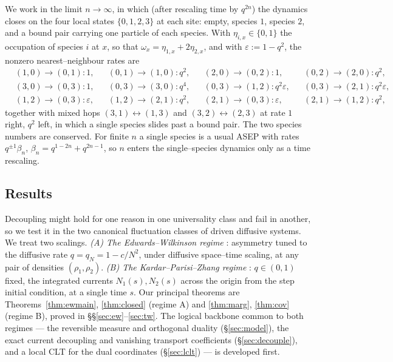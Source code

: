 \documentclass[11pt]{article}
\theoremstyle{plain}
\theoremstyle{definition}
\theoremstyle{remark}
\newcommand{\eps}{\varepsilon}\newcommand{\Exp}{\mathrm{Exp}}
\begin{document}
We work in the limit $n\to\infty$, in which (after rescaling time by $q^{2n}$) the
dynamics closes on the four local states $\{0,1,2,3\}$ at each site: empty, species
$1$, species $2$, and a bound pair carrying one particle of each species. With
$\eta_{i,x}\in\{0,1\}$ the occupation of species $i$ at $x$, so that
$\omega_x=\eta_{1,x}+2\eta_{2,x}$, and with $\eps:=1-q^2$, the nonzero
nearest--neighbour rates are
\begin{equation}\label{eq:rates}
\begin{aligned}
&(1,0)\!\to\!(0,1):1, &&(0,1)\!\to\!(1,0):q^2, &&(2,0)\!\to\!(0,2):1, &&(0,2)\!\to\!(2,0):q^2,\\
&(3,0)\!\to\!(0,3):1, &&(0,3)\!\to\!(3,0):q^4, &&(0,3)\!\to\!(1,2):q^2\eps, &&(0,3)\!\to\!(2,1):q^2\eps,\\
&(1,2)\!\to\!(0,3):\eps, &&(1,2)\!\to\!(2,1):q^2, &&(2,1)\!\to\!(0,3):\eps, &&(2,1)\!\to\!(1,2):q^2,
\end{aligned}
\end{equation}
together with mixed hops $(3,1)\!\leftrightarrow\!(1,3)$ and
$(3,2)\!\leftrightarrow\!(2,3)$ at rate $1$ right, $q^2$ left, in which a single
species slides past a bound pair. The two species numbers are conserved. For finite
$n$ a single species is a usual ASEP with rates $q^{\pm1}\beta_n$,
$\beta_n=q^{1-2n}+q^{2n-1}$, so $n$ enters the single--species dynamics only as a time
rescaling.

\subsection{Results}\label{sec:introresults}
Decoupling might hold for one reason in one universality class and fail in another, so
we test it in the two canonical fluctuation classes of driven diffusive systems. We
treat two scalings. \emph{(A) The Edwards--Wilkinson regime} \cite{EW}: asymmetry tuned to
the diffusive rate $q=q_N=1-c/N^2$, under diffusive space--time scaling, at any pair of
densities $(\rho_1,\rho_2)$. \emph{(B) The Kardar--Parisi--Zhang
regime} \cite{KPZ}: $q\in(0,1)$ fixed, the integrated currents $N_1(s),N_2(s)$ across the origin
from the step initial condition, at a single time $s$. Our principal theorems are
Theorems~\ref{thm:ewmain}, \ref{thm:closed} (regime A) and \ref{thm:marg},
\ref{thm:cov} (regime B), proved in \S\S\ref{sec:ew}--\ref{sec:tw}. The logical
backbone common to both regimes --- the reversible measure and orthogonal duality
(\S\ref{sec:model}), the exact current decoupling and vanishing transport
coefficients (\S\ref{sec:decouple}), and a local CLT for the dual coordinates
(\S\ref{sec:lclt}) --- is developed first.
\end{document}
